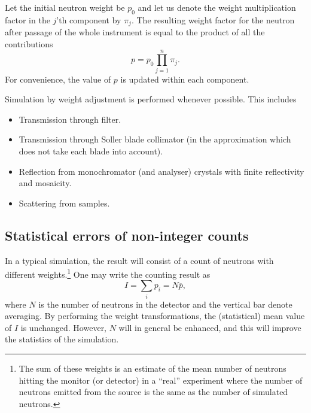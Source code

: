 Let the initial neutron weight be $p_0$ and let us denote the weight
multiplication factor in the $j$'th component by $\pi_j$.  The resulting
weight factor for the neutron after passage of the whole instrument is
equal to the product of all the contributions
\begin{equation}
\label{e:probprod}
p = p_0 \prod_{j=1}^n \pi_j .
\end{equation}
For convenience, the value of $p$ is updated within each component.

Simulation by weight adjustment is performed
whenever possible. This includes
\begin{itemize}
\item Transmission through filter.
\item Transmission through Soller blade collimator
 (in the approximation
 which does not take each blade into account).
\item Reflection from monochromator (and analyser) crystals
 with finite reflectivity and mosaicity.
\item Scattering from samples.
\end{itemize}

\subsection{Statistical errors of non-integer counts}
\label{s:staterror}

In a typical simulation, the result will consist of a
count of neutrons with different weights.\footnote{The
sum of these weights is an estimate of
the mean number of neutrons hitting the monitor
(or detector) in a ``real'' experiment
where the number of neutrons emitted from the source
is the same as the number of simulated neutrons.}
One may write the counting result as
\begin{equation}
\label{psum}
I = \sum_i p_i = N \overline{p} ,
\end{equation}
where $N$ is the number of neutrons in the detector and the vertical bar denote
averaging.
By performing the weight transformations, the (statistical)
mean value of $I$ is unchanged.
However, $N$ will in general be enhanced,
and this will improve the statistics of the simulation.

